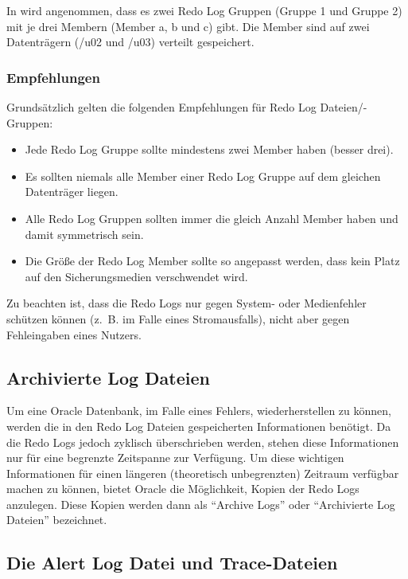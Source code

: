             In  wird angenommen, dass es zwei Redo Log Gruppen (Gruppe 1 und Gruppe 2) mit je drei Membern (Member a, b und c) gibt. Die Member sind auf zwei Datenträgern (/u02 und /u03) verteilt gespeichert.

\clearpage
          \subsubsection{Empfehlungen}
            Grundsätzlich gelten die folgenden Empfehlungen für Redo Log Dateien/-Gruppen:
            \begin{itemize}
              \item Jede Redo Log Gruppe sollte mindestens zwei Member haben (besser drei).
              \item Es sollten niemals alle Member einer Redo Log Gruppe auf dem gleichen Datenträger liegen.
              \item Alle Redo Log Gruppen sollten immer die gleich Anzahl Member haben und damit symmetrisch sein.
              \item Die Größe der Redo Log Member sollte so angepasst werden, dass kein Platz auf den Sicherungsmedien verschwendet wird.
            \end{itemize}
			
            \begin{merke}
              Zu beachten ist, dass die Redo Logs nur gegen System- oder Medienfehler schützen können (z.~B. im Falle eines Stromausfalls), nicht aber gegen Fehleingaben eines Nutzers.
            \end{merke}
        \subsection{Archivierte Log Dateien}
          Um eine Oracle Datenbank, im Falle eines Fehlers, wiederherstellen zu können, werden die in den Redo Log Dateien gespeicherten Informationen benötigt. Da die Redo Logs jedoch zyklisch überschrieben werden, stehen diese Informationen nur für eine begrenzte Zeitspanne zur Verfügung. Um diese wichtigen Informationen für einen längeren (theoretisch unbegrenzten) Zeitraum verfügbar machen zu können, bietet Oracle die Möglichkeit, Kopien der Redo Logs anzulegen. Diese Kopien werden dann als \enquote{Archive Logs} oder \enquote{Archivierte Log Dateien} bezeichnet.
        \subsection{Die Alert Log Datei und Trace-Dateien}
